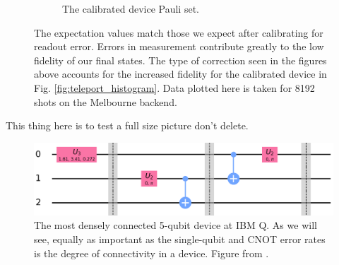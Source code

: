 \begin{figure}
\begin{subfigure}{.5\textwidth}
    \caption{The calibrated device Pauli set.}
    \label{fig:tele_pauli_dev}
  \end{subfigure}
  \caption{The expectation values match those we expect after calibrating for
readout error. Errors in measurement contribute greatly to the low fidelity of
our final states. The type of correction seen in the figures above accounts for
the increased fidelity for the calibrated device in Fig.
\ref{fig:teleport_histogram}. Data plotted here is taken for 8192 shots on the
Melbourne backend.}
  \label{fig:tele_paulis}
\end{figure}


This thing here is to test a full size picture don't delete.
\begin{figure}
  \centering
  \includegraphics[width=\textwidth]{images/teleport_ibmqx2.png}
  \caption{The most densely connected 5-qubit device at IBM Q. As we will see,
    equally as important as the single-qubit and CNOT error rates is the degree of
    connectivity in a device. Figure from \cite{ibmq_yorktown}.}
  \label{fig:yorktown_connections}
\end{figure}

